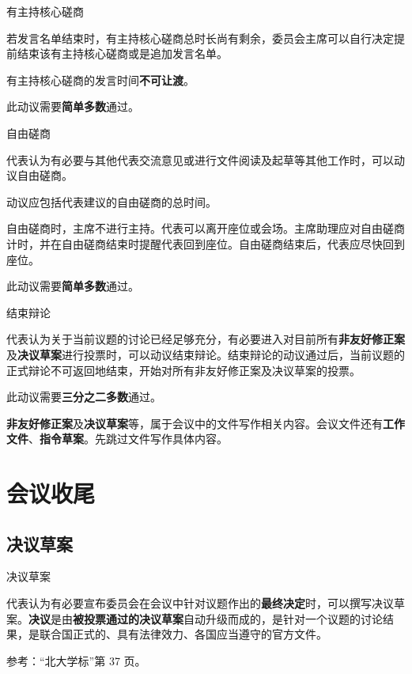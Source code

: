 \documentclass{beamer}
\begin{document}
\begin{frame}{有主持核心磋商}

若发言名单结束时，有主持核心磋商总时长尚有剩余，委员会主席可以自行决定提前结束该有主持核心磋商或是追加发言名单。

有主持核心磋商的发言时间\textbf{不可让渡}。

此动议需要\textbf{简单多数}通过。

\end{frame}

\begin{frame}{自由磋商}

代表认为有必要与其他代表交流意见或进行文件阅读及起草等其他工作时，可以动议自由磋商。

动议应包括代表建议的自由磋商的总时间。

自由磋商时，主席不进行主持。代表可以离开座位或会场。主席助理应对自由磋商计时，并在自由磋商结束时提醒代表回到座位。自由磋商结束后，代表应尽快回到座位。

此动议需要\textbf{简单多数}通过。

\end{frame}

\begin{frame}{结束辩论}

代表认为关于当前议题的讨论已经足够充分，有必要进入对目前所有\textbf{非友好修正案}及\textbf{决议草案}进行投票时，可以动议结束辩论。结束辩论的动议通过后，当前议题的正式辩论不可返回地结束，开始对所有非友好修正案及决议草案的投票。

此动议需要\textbf{三分之二多数}通过。

\textbf{非友好修正案}及\textbf{决议草案}等，属于会议中的文件写作相关内容。会议文件还有\textbf{工作文件}、\textbf{指令草案}。先跳过文件写作具体内容。

\end{frame}

\section{会议收尾}

\subsection{决议草案}

\begin{frame}{决议草案}

代表认为有必要宣布委员会在会议中针对议题作出的\textbf{最终决定}时，可以撰写决议草案。\textbf{决议}是由\textbf{被投票通过的决议草案}自动升级而成的，是针对一个议题的讨论结果，是联合国正式的、具有法律效力、各国应当遵守的官方文件。

参考：“北大学标”第 37 页。

\end{frame}
\end{document}
